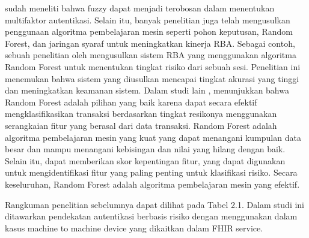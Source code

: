 \cite{roy_fuzzy_2018} sudah meneliti bahwa fuzzy dapat menjadi terobosan
dalam menentukan multifaktor autentikasi. Selain itu, banyak penelitian juga telah
mengusulkan penggunaan algoritma pembelajaran mesin seperti pohon keputusan,
Random Forest, dan jaringan syaraf untuk meningkatkan kinerja RBA. Sebagai
contoh, sebuah penelitian oleh \cite{zhang_location-based_2012} mengusulkan sistem RBA
yang menggunakan algoritma Random Forest untuk menentukan tingkat risiko dari
sebuah sesi. Penelitian ini menemukan bahwa sistem yang diusulkan mencapai
tingkat akurasi yang tinggi dan meningkatkan keamanan sistem. Dalam studi lain
\cite{alam_random_2013}, \cite{cabarcos_survey_2019} menunjukkan bahwa Random Forest
adalah pilihan yang baik karena dapat secara efektif mengklasifikasikan transaksi
berdasarkan tingkat resikonya menggunakan serangkaian fitur yang berasal dari
data transaksi. Random Forest adalah algoritma pembelajaran mesin yang kuat yang
dapat menangani kumpulan data besar dan mampu menangani kebisingan dan nilai
yang hilang dengan baik. Selain itu, dapat memberikan skor kepentingan fitur, yang
dapat digunakan untuk mengidentifikasi fitur yang paling penting untuk klasifikasi
risiko. Secara keseluruhan, Random Forest adalah algoritma pembelajaran mesin
yang efektif.

Rangkuman penelitian sebelumnya dapat dilihat pada Tabel 2.1. Dalam studi
ini ditawarkan pendekatan autentikasi berbasis risiko dengan menggunakan dalam
kasus machine to machine device yang dikaitkan dalam FHIR service.

